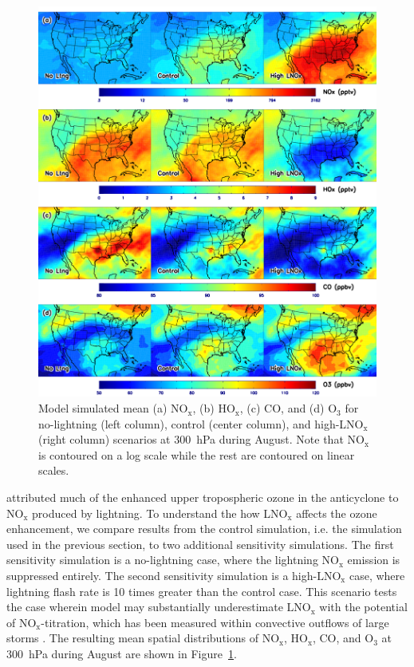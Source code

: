  \begin{figure}
 \noindent\includegraphics[width=40pc]{Figures/ltngsens_map.png}
 \caption[Sensitivity of various species to  at 300~hPa]
{\small Model simulated mean (a) NO$_{\mathrm{x}}$, (b) HO$_{\mathrm{x}}$,
(c) CO, and (d) O$_3$ for no-lightning (left column), control (center
column), and high-LNO$_{\mathrm{x}}$ (right column) scenarios at 300~hPa
during August. Note that NO$_{\mathrm{x}}$ is contoured on a log scale
while the rest are contoured on linear scales.}
 \label{fig:ltng_map}
 \end{figure}

\citet{Cooper:2007cr} attributed much of the enhanced upper tropospheric ozone in the
anticyclone to $\mathrm{NO_x}$ produced by lightning. To understand the how LNO$_{\mathrm{x}}$
affects the ozone enhancement, we compare results from the control simulation, i.e.
the simulation used in the previous section, to two additional sensitivity simulations.
The first sensitivity simulation is a no-lightning case, where the lightning $\mathrm{NO_x}$ emission is suppressed entirely.
The second sensitivity simulation is a high-$\mathrm{LNO_x}$ case, where lightning flash rate is 10 times greater
than the control case. This scenario tests the case wherein model may substantially underestimate $\mathrm{LNO_x}$
with the potential of $\mathrm{NO_x}$-titration, which has been measured within convective outflows of large
storms \citep[e.g.][]{Stith:1999fk,Ridley:2004oa,Ott:2007hs,Cummings:2013vn}. The resulting mean spatial
distributions of NO$_{\mathrm{x}}$, HO$_{\mathrm{x}}$, CO, and O$_3$ at 300~hPa
during August are shown in Figure~\ref{fig:ltng_map}.

